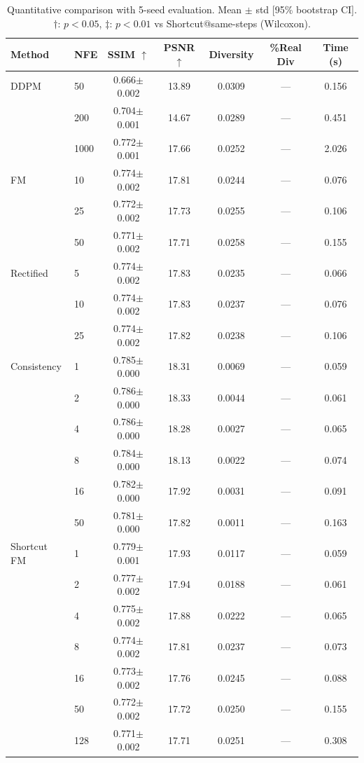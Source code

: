 \begin{table}[t]
\centering
\caption{Quantitative comparison with 5-seed evaluation. Mean $\pm$ std [95\% bootstrap CI]. $\dagger$: $p<0.05$, $\ddagger$: $p<0.01$ vs Shortcut@same-steps (Wilcoxon).}
\label{tab:main_5seed}
\footnotesize
\begin{tabular}{llccccc}
\toprule
Method & NFE & SSIM $\uparrow$ & PSNR $\uparrow$ & Diversity & \%Real Div & Time (s) \\
\midrule
  DDPM & 50 & 0.666$\pm$0.002 & 13.89 & 0.0309 & — & 0.156 \\
   & 200 & 0.704$\pm$0.001 & 14.67 & 0.0289 & — & 0.451 \\
   & 1000 & 0.772$\pm$0.001 & 17.66 & 0.0252 & — & 2.026 \\
\midrule
  FM & 10 & 0.774$\pm$0.002 & 17.81 & 0.0244 & — & 0.076 \\
   & 25 & 0.772$\pm$0.002 & 17.73 & 0.0255 & — & 0.106 \\
   & 50 & 0.771$\pm$0.002 & 17.71 & 0.0258 & — & 0.155 \\
\midrule
  Rectified & 5 & 0.774$\pm$0.002 & 17.83 & 0.0235 & — & 0.066 \\
   & 10 & 0.774$\pm$0.002 & 17.83 & 0.0237 & — & 0.076 \\
   & 25 & 0.774$\pm$0.002 & 17.82 & 0.0238 & — & 0.106 \\
\midrule
  Consistency & 1 & 0.785$\pm$0.000 & 18.31 & 0.0069 & — & 0.059 \\
   & 2 & 0.786$\pm$0.000 & 18.33 & 0.0044 & — & 0.061 \\
   & 4 & 0.786$\pm$0.000 & 18.28 & 0.0027 & — & 0.065 \\
   & 8 & 0.784$\pm$0.000 & 18.13 & 0.0022 & — & 0.074 \\
   & 16 & 0.782$\pm$0.000 & 17.92 & 0.0031 & — & 0.091 \\
   & 50 & 0.781$\pm$0.000 & 17.82 & 0.0011 & — & 0.163 \\
\midrule
  Shortcut FM & 1 & 0.779$\pm$0.001 & 17.93 & 0.0117 & — & 0.059 \\
   & 2 & 0.777$\pm$0.002 & 17.94 & 0.0188 & — & 0.061 \\
   & 4 & 0.775$\pm$0.002 & 17.88 & 0.0222 & — & 0.065 \\
   & 8 & 0.774$\pm$0.002 & 17.81 & 0.0237 & — & 0.073 \\
   & 16 & 0.773$\pm$0.002 & 17.76 & 0.0245 & — & 0.088 \\
   & 50 & 0.772$\pm$0.002 & 17.72 & 0.0250 & — & 0.155 \\
   & 128 & 0.771$\pm$0.002 & 17.71 & 0.0251 & — & 0.308 \\
\bottomrule
\end{tabular}
\end{table}